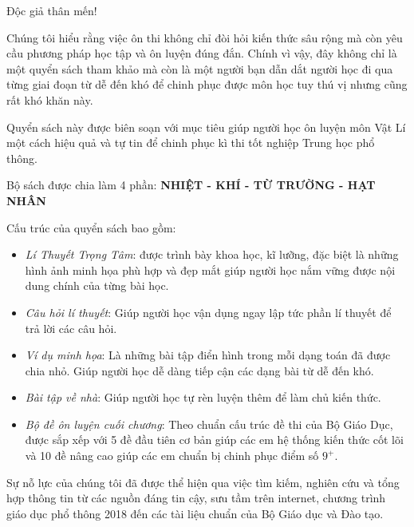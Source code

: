 \par
Độc giả thân mến! 

Chúng tôi hiểu rằng việc ôn thi không chỉ đòi hỏi kiến thức sâu rộng mà còn yêu cầu phương pháp học tập và ôn luyện đúng đắn. Chính vì vậy, đây không chỉ là một quyển sách tham khảo mà còn là một người bạn dẫn dắt người học đi qua từng giai đoạn từ dễ đến khó để chinh phục được môn học tuy thú vị nhưng cũng rất khó khăn này.

Quyển sách này được biên soạn với mục tiêu giúp người học ôn luyện môn Vật Lí một cách hiệu quả và tự tin để chinh phục kì thi tốt nghiệp Trung học phổ thông.

Bộ sách được chia làm 4 phần: \textcolor{coolblack}{\textbf{NHIỆT - KHÍ - TỪ TRƯỜNG - HẠT NHÂN}}

Cấu trúc của quyển sách bao gồm: 
\begin{itemize}
	\item  \textit{Lí Thuyết Trọng Tâm}: được trình bày khoa học, kĩ lưỡng, đặc biệt là những hình ảnh minh họa phù hợp và đẹp mắt giúp người học nắm vững được nội dung chính của từng bài học.
	\item  \textit{Câu hỏi lí thuyết}: Giúp người học vận dụng ngay lập tức phần lí thuyết để trả lời các câu hỏi.
	\item \textit{Ví dụ minh họa}: Là những bài tập điển hình trong mỗi dạng toán đã được chia nhỏ. Giúp người học dễ dàng tiếp cận các dạng bài từ dễ đến khó.
	\item \textit{Bài tập về nhà}: Giúp người học tự rèn luyện thêm để làm chủ kiến thức.
	\item \textit{Bộ đề ôn luyện cuối chương}: Theo chuẩn cấu trúc đề thi của Bộ Giáo Dục, được sắp xếp với 5 đề đầu tiên cơ bản giúp các em hệ thống kiến thức cốt lõi và 10 đề nâng cao giúp các em chuẩn bị chinh phục điểm số $9^+$.
\end{itemize}

Sự nỗ lực của chúng tôi đã được thể hiện qua việc tìm kiếm, nghiên cứu và tổng hợp thông tin từ các nguồn đáng tin cậy, sưu tầm trên internet, chương trình giáo dục phổ thông 2018 đến các tài liệu chuẩn của Bộ Giáo dục và Đào tạo. 

